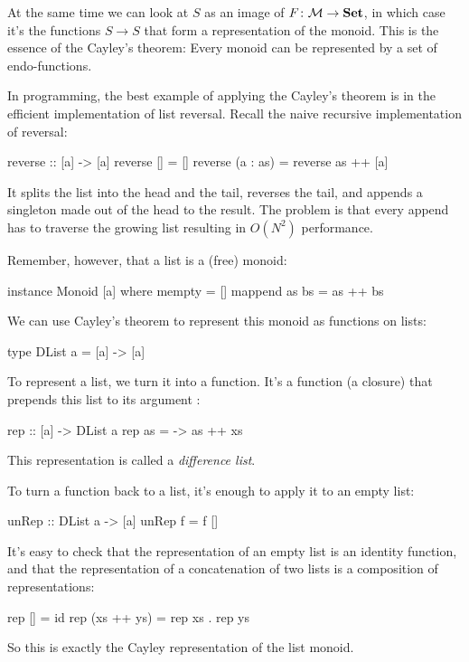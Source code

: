 \documentclass[DaoFP]{subfiles}
\begin{document}
At the same time we can look at $S$ as an image of $F \colon \mathcal{M} \to \mathbf{Set}$, in which case it's the functions $S \to S$ that form a representation of the monoid. This is the essence of the Cayley's theorem: Every monoid can be represented by a set of endo-functions.

In programming, the best example of applying the Cayley's theorem is in the efficient implementation of list reversal. Recall the naive recursive implementation of reversal:
\begin{haskell}
reverse :: [a] -> [a]
reverse [] = []
reverse (a : as) = reverse as ++ [a]
\end{haskell}
It splits the list into the head and the tail, reverses the tail, and appends a singleton made out of the head to the result. The problem is that every append has to traverse the growing list resulting in $O(N^2)$ performance.

Remember, however, that a list is a (free) monoid:
\begin{haskell}
instance Monoid [a] where
  mempty = []
  mappend as bs = as ++ bs
\end{haskell}
We can use Cayley's theorem to represent this monoid as functions on lists:
\begin{haskell}
type DList a = [a] -> [a]
\end{haskell}
To represent a list, we turn it into a function. It's a function (a closure) that prepends this list  to its argument :
\begin{haskell}
rep :: [a] -> DList a
rep as = \xs -> as ++ xs
\end{haskell}
This representation is called a \emph{difference list}.

To turn a function back to a list, it's enough to apply it to an empty list:
\begin{haskell}
unRep :: DList a -> [a]
unRep f = f []
\end{haskell}
It's easy to check that the representation of an empty list is an identity function, and that the representation of a concatenation of two lists is a composition of representations:
\begin{haskell}
rep [] = id
rep (xs ++ ys) = rep xs . rep ys
\end{haskell}
So this is exactly the Cayley representation of the list monoid.
\end{document}
